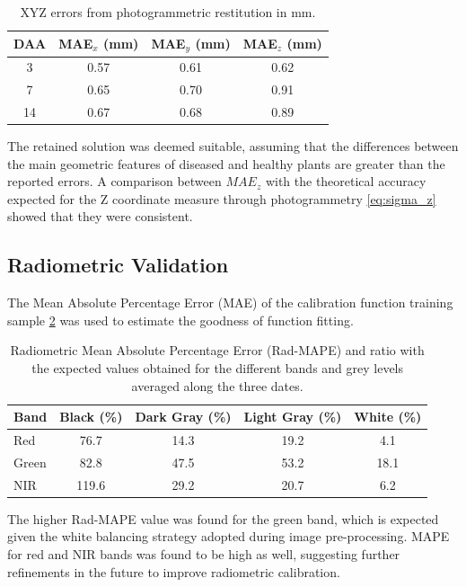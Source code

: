 \documentclass[12pt,a4paper,oneside]{report}
\begin{document}
\begin{table}[H]
    \centering
    \caption{XYZ errors from photogrammetric restitution in mm.}
    \begin{tabular}{cccc}
    \toprule
    \textbf{DAA} & \textbf{MAE$_x$ (mm)} & \textbf{MAE$_y$ (mm)} & \textbf{MAE$_z$ (mm)} \\
    \midrule
    3 & 0.57 & 0.61 & 0.62 \\
    7 & 0.65 & 0.70 & 0.91 \\
    14 & 0.67 & 0.68 & 0.89 \\
    \bottomrule
    \end{tabular}
    \label{tab:geometric_errors}
\end{table}

The retained solution was deemed suitable, assuming that the differences between the main geometric features of diseased and healthy plants are greater than the reported errors. A comparison between
$MAE_z$ with the theoretical accuracy expected for the Z coordinate measure through photogrammetry
\cref{eq:sigma_z} showed that they were consistent.

\subsection{Radiometric Validation}

The Mean Absolute Percentage Error (MAE) of the calibration function training sample \cref{tab:Rad-MAPE} was used to estimate the goodness of function fitting.

\begin{table}[H]
    \centering
    \caption{Radiometric Mean Absolute Percentage Error (Rad-MAPE) and ratio with the expected values obtained for the different bands and grey levels averaged along the three dates.}
    \begin{tabular}{lcccc}
    \toprule
    \textbf{Band} & \textbf{Black (\%)} & \textbf{Dark Gray (\%)} & \textbf{Light Gray (\%)} & \textbf{White (\%)} \\
    \midrule
    Red & 76.7 & 14.3 & 19.2 & 4.1 \\
    Green & 82.8 & 47.5 & 53.2 & 18.1 \\
    NIR & 119.6 & 29.2 & 20.7 & 6.2 \\
    \bottomrule
    \end{tabular}
    \label{tab:Rad-MAPE}
\end{table}

The higher Rad-MAPE value was found for the green band, which is expected given the white balancing strategy adopted during image pre-processing.
MAPE for red and NIR bands was found to be high as well, suggesting further refinements in the future to improve radiometric calibration.
\end{document}

